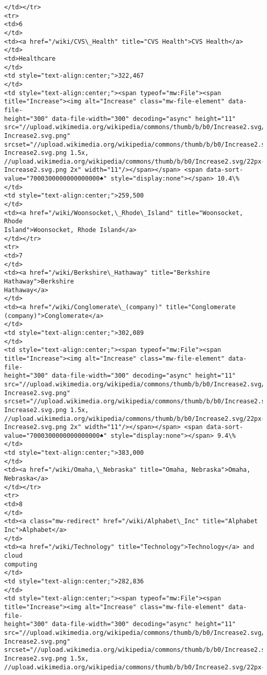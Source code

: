 \documentclass[11pt]{article}
\begin{document}
\begin{Verbatim}[commandchars=\\\{\}]
</td></tr>
<tr>
<td>6
</td>
<td><a href="/wiki/CVS\_Health" title="CVS Health">CVS Health</a>
</td>
<td>Healthcare
</td>
<td style="text-align:center;">322,467
</td>
<td style="text-align:center;"><span typeof="mw:File"><span
title="Increase"><img alt="Increase" class="mw-file-element" data-file-
height="300" data-file-width="300" decoding="async" height="11"
src="//upload.wikimedia.org/wikipedia/commons/thumb/b/b0/Increase2.svg/11px-
Increase2.svg.png"
srcset="//upload.wikimedia.org/wikipedia/commons/thumb/b/b0/Increase2.svg/17px-
Increase2.svg.png 1.5x,
//upload.wikimedia.org/wikipedia/commons/thumb/b/b0/Increase2.svg/22px-
Increase2.svg.png 2x" width="11"/></span></span> <span data-sort-
value="7000300000000000000♠" style="display:none"></span> 10.4\%
</td>
<td style="text-align:center;">259,500
</td>
<td><a href="/wiki/Woonsocket,\_Rhode\_Island" title="Woonsocket, Rhode
Island">Woonsocket, Rhode Island</a>
</td></tr>
<tr>
<td>7
</td>
<td><a href="/wiki/Berkshire\_Hathaway" title="Berkshire Hathaway">Berkshire
Hathaway</a>
</td>
<td><a href="/wiki/Conglomerate\_(company)" title="Conglomerate
(company)">Conglomerate</a>
</td>
<td style="text-align:center;">302,089
</td>
<td style="text-align:center;"><span typeof="mw:File"><span
title="Increase"><img alt="Increase" class="mw-file-element" data-file-
height="300" data-file-width="300" decoding="async" height="11"
src="//upload.wikimedia.org/wikipedia/commons/thumb/b/b0/Increase2.svg/11px-
Increase2.svg.png"
srcset="//upload.wikimedia.org/wikipedia/commons/thumb/b/b0/Increase2.svg/17px-
Increase2.svg.png 1.5x,
//upload.wikimedia.org/wikipedia/commons/thumb/b/b0/Increase2.svg/22px-
Increase2.svg.png 2x" width="11"/></span></span> <span data-sort-
value="7000300000000000000♠" style="display:none"></span> 9.4\%
</td>
<td style="text-align:center;">383,000
</td>
<td><a href="/wiki/Omaha,\_Nebraska" title="Omaha, Nebraska">Omaha, Nebraska</a>
</td></tr>
<tr>
<td>8
</td>
<td><a class="mw-redirect" href="/wiki/Alphabet\_Inc" title="Alphabet
Inc">Alphabet</a>
</td>
<td><a href="/wiki/Technology" title="Technology">Technology</a> and cloud
computing
</td>
<td style="text-align:center;">282,836
</td>
<td style="text-align:center;"><span typeof="mw:File"><span
title="Increase"><img alt="Increase" class="mw-file-element" data-file-
height="300" data-file-width="300" decoding="async" height="11"
src="//upload.wikimedia.org/wikipedia/commons/thumb/b/b0/Increase2.svg/11px-
Increase2.svg.png"
srcset="//upload.wikimedia.org/wikipedia/commons/thumb/b/b0/Increase2.svg/17px-
Increase2.svg.png 1.5x,
//upload.wikimedia.org/wikipedia/commons/thumb/b/b0/Increase2.svg/22px-

\end{Verbatim}
\end{document}
